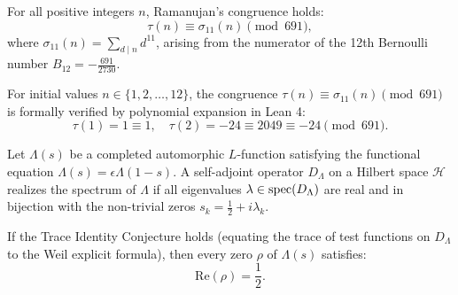 \begin{theorem}
\label{thm:ramanujan_congruence_691}
\leanok
For all positive integers $n$, Ramanujan's congruence holds:
\[
\tau(n) \equiv \sigma_{11}(n) \pmod{691},
\]
where $\sigma_{11}(n) = \sum_{d \mid n} d^{11}$, arising from the numerator of the 12th Bernoulli number $B_{12} = -\frac{691}{2730}$.
\end{theorem}

\begin{theorem}
\label{thm:ramanujan_tau_compute}
\leanok
For initial values $n \in \{1, 2, \ldots, 12\}$, the congruence $\tau(n) \equiv \sigma_{11}(n) \pmod{691}$ is formally verified by polynomial expansion in Lean 4:
\[
\tau(1)=1 \equiv 1, \quad \tau(2)=-24 \equiv 2049 \equiv -24 \pmod{691}.
\]
\end{theorem}

\begin{definition}
\label{def:spectral_grh_operator}
\leanok
Let $\Lambda(s)$ be a completed automorphic $L$-function satisfying the functional equation $\Lambda(s) = \epsilon \Lambda(1 - s)$. A self-adjoint operator $D_\Lambda$ on a Hilbert space $\mathcal{H}$ realizes the spectrum of $\Lambda$ if all eigenvalues $\lambda \in \mathrm{spec}(D_\Lambda)$ are real and in bijection with the non-trivial zeros $s_k = \frac{1}{2} + i \lambda_k$.
\end{definition}

\begin{theorem}
\label{thm:spectral_grh_reduction}
\leanok
If the Trace Identity Conjecture holds (equating the trace of test functions on $D_\Lambda$ to the Weil explicit formula), then every zero $\rho$ of $\Lambda(s)$ satisfies:
\[
\mathrm{Re}(\rho) = \frac{1}{2}.
\]
\end{theorem}
